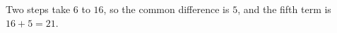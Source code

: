 Two steps take $6$ to $16$, so the common difference is $5$, and the fifth term is $16+5=\boxed{21}$.
